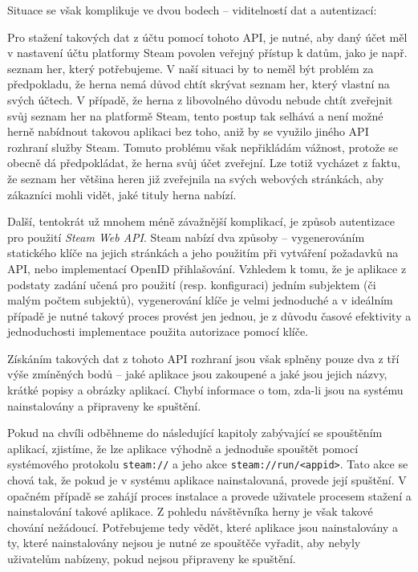 Situace se však komplikuje ve dvou bodech -- viditelností dat a
autentizací:

Pro stažení takových dat z účtu pomocí tohoto API, je nutné, aby daný
účet měl v nastavení účtu platformy Steam povolen veřejný přístup k
datům, jako je např. seznam her, který potřebujeme. V naší situaci by to
neměl být problém za předpokladu, že herna nemá důvod chtít skrývat
seznam her, který vlastní na svých účtech. V případě, že herna z
libovolného důvodu nebude chtít zveřejnit svůj seznam her na platformě
Steam, tento postup tak selhává a není možné herně nabídnout takovou
aplikaci bez toho, aniž by se využilo jiného API rozhraní služby Steam.
Tomuto problému však nepřikládám vážnost, protože se obecně dá
předpokládat, že herna svůj účet zveřejní. Lze totiž vycházet z faktu,
že seznam her většina heren již zveřejnila na svých webových stránkách,
aby zákazníci mohli vidět, jaké tituly herna nabízí.

Další, tentokrát už mnohem méně závažnější komplikací, je způsob
autentizace pro použití \emph{Steam Web API}. Steam nabízí dva způsoby
-- vygenerováním statického klíče na jejich stránkách a jeho použitím
při vytváření požadavků na API, nebo implementací OpenID přihlašování.
Vzhledem k tomu, že je aplikace z podstaty zadání učená pro použití
(resp. konfiguraci) jedním subjektem (či malým počtem subjektů),
vygenerování klíče je velmi jednoduché a v ideálním případě je nutné
takový proces provést jen jednou, je z důvodu časové efektivity a
jednoduchosti implementace použita autorizace pomocí klíče.

Získáním takových dat z tohoto API rozhraní jsou však splněny pouze dva
z tří výše zmíněných bodů -- jaké aplikace jsou zakoupené a jaké jsou
jejich názvy, krátké popisy a obrázky aplikací. Chybí informace o tom,
zda-li jsou na systému nainstalovány a připraveny ke spuštění.

Pokud na chvíli odběhneme do následující kapitoly zabývající se
spouštěním aplikací, zjistíme, že lze aplikace výhodně a jednoduše
spouštět pomocí systémového protokolu \texttt{steam://} a jeho akce
\texttt{steam://run/\textless{}appid\textgreater{}}. Tato akce se chová
tak, že pokud je v systému aplikace nainstalovaná, provede její
spuštění. V opačném případě se zahájí proces instalace a provede
uživatele procesem stažení a nainstalování takové aplikace. Z pohledu
návštěvníka herny je však takové chování nežádoucí. Potřebujeme tedy
vědět, které aplikace jsou nainstalovány a ty, které nainstalovány
nejsou je nutné ze spouštěče vyřadit, aby nebyly uživatelům nabízeny,
pokud nejsou připraveny ke spuštění.

